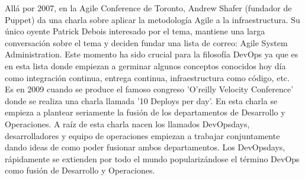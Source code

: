 	\begin{text}
		Allá por 2007, en la Agile Conference de Toronto, Andrew Shafer (fundador de Puppet) da una charla sobre aplicar la metodología Agile a la infraestructura. Su único oyente Patrick Debois interesado por el tema, mantiene una larga conversación sobre el tema y deciden fundar una lista de correo: Agile System Administration. Este momento ha sido crucial para la filosofía DevOps ya que es en esta lista donde empiezan a germinar algunos conceptos conocidos hoy día como integración continua, entrega continua, infraestructura como código, etc.\\
		Es en 2009 cuando se produce el famoso congreso  'O'reilly Velocity Conference' donde se realiza una charla llamada '10 Deploys per day'. En esta charla se empieza a plantear seriamente la fusión de los departamentos de Desarrollo y Operaciones. A raíz de esta charla nacen los llamados DevOpsdays, desarrolladores y equipo de operaciones empiezan a trabajar conjuntamente dando ideas de como poder fusionar ambos departamentos. Los DevOpsdays, rápidamente se extienden por todo el mundo popularizándose el término DevOps como fusión de Desarrollo y Operaciones. \\


\end{text}

